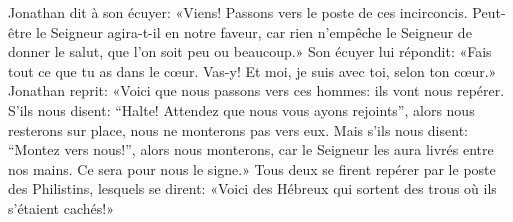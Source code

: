 Jonathan dit à son écuyer:
	«Viens! Passons vers le poste de ces incirconcis.
Peut-être le Seigneur agira-t-il en notre faveur,
	car rien n’empêche le Seigneur de donner le salut, que l’on soit peu ou beaucoup.»
Son écuyer lui répondit: «Fais tout ce que tu as dans le cœur.
	Vas-y! Et moi, je suis avec toi, selon ton cœur.»
Jonathan reprit:
	«Voici que nous passons vers ces hommes: ils vont nous repérer.
S’ils nous disent: “Halte! Attendez que nous vous ayons rejoints”,
	alors nous resterons sur place, nous ne monterons pas vers eux.
Mais s’ils nous disent: “Montez vers nous!”,
	alors nous monterons, car le Seigneur les aura livrés entre nos mains.
Ce sera pour nous le signe.»
Tous deux se firent repérer par le poste des Philistins, lesquels se dirent:
	«Voici des Hébreux qui sortent des trous où ils s’étaient cachés!»
